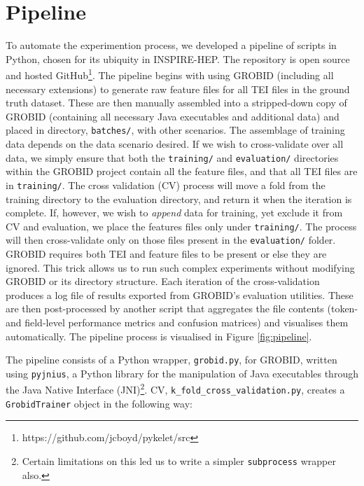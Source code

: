 \section{Pipeline}
\label{sec:pipeline}

To automate the experimention process, we developed a pipeline of scripts in Python, chosen for its ubiquity in INSPIRE-HEP. The repository is open source and hosted GitHub\footnote{https://github.com/jcboyd/pykelet/src}. The pipeline begins with using GROBID (including all necessary extensions) to generate raw feature files for all TEI files in the ground truth dataset. These are then manually assembled into a stripped-down copy of GROBID (containing all necessary Java executables and additional data) and placed in directory, \texttt{batches/}, with other scenarios. The assemblage of training data depends on the data scenario desired. If we wish to cross-validate over all data, we simply ensure that both the \texttt{training/} and \texttt{evaluation/} directories within the GROBID project contain all the feature files, and that all TEI files are in \texttt{training/}. The cross validation (CV) process will move a fold from the training directory to the evaluation directory, and return it when the iteration is complete. If, however, we wish to \emph{append} data for training, yet exclude it from CV and evaluation, we place the features files only under \texttt{training/}. The process will then cross-validate only on those files present in the \texttt{evaluation/} folder. GROBID requires both TEI and feature files to be present or else they are ignored. This trick allows us to run such complex experiments without modifying GROBID or its directory structure. Each iteration of the cross-validation produces a log file of results exported from GROBID's evaluation utilities. These are then post-processed by another script that aggregates the file contents (token- and field-level performance metrics and confusion matrices) and visualises them automatically. The pipeline process is visualised in Figure \ref{fig:pipeline}.

The pipeline consists of a Python wrapper, \texttt{grobid.py}, for GROBID, written using \texttt{pyjnius}, a Python library for the manipulation of Java executables through the Java Native Interface (JNI)\footnote{Certain limitations on this led us to write a simpler \texttt{subprocess} wrapper also.}. CV, \texttt{k\_fold\_cross\_validation.py}, creates a \texttt{GrobidTrainer} object in the following way:\\


